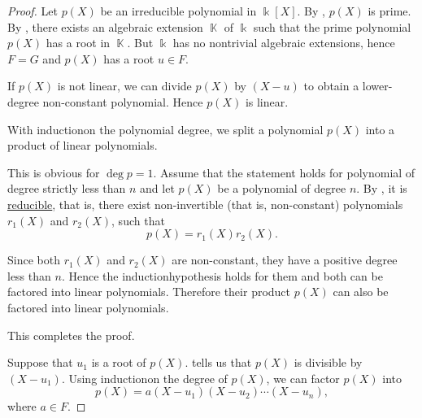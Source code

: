 \begin{proof}
   Let \( p(X) \) be an irreducible polynomial in \( \Bbbk[X] \). By , \( p(X) \) is prime. By , there exists an algebraic extension \( \BbbK \) of \( \Bbbk \) such that the prime polynomial \( p(X) \) has a root in \( \BbbK \). But \( \Bbbk \) has no nontrivial algebraic extensions, hence \( F = G \) and \( p(X) \) has a root \( u \in F \).

  If \( p(X) \) is not linear\LEM, we can divide \( p(X) \) by \( (X - u) \) to obtain a lower-degree non-constant polynomial. Hence \( p(X) \) is linear.

   With induction\IND on the polynomial degree, we split a polynomial \( p(X) \) into a product of linear polynomials.

  This is obvious for \( \deg p = 1 \). Assume that the statement holds for polynomial of degree strictly less than \( n \) and let \( p(X) \) be a polynomial of degree \( n \). By , it is \hyperref[def:irreducible_ring_element]{reducible}, that is, there exist non-invertible (that is, non-constant) polynomials \( r_1(X) \) and \( r_2(X) \), such that
  \begin{equation*}
    p(X) = r_1(X) r_2(X).
  \end{equation*}

  Since both \( r_1(X) \) and \( r_2(X) \) are non-constant, they have a positive degree less than \( n \). Hence the induction\IND hypothesis holds for them and both can be factored into linear polynomials. Therefore their product \( p(X) \) can also be factored into linear polynomials.

  This completes the proof.

   Suppose that \( u_1 \) is a root of \( p(X) \).  tells us that \( p(X) \) is divisible by \( (X - u_1) \). Using induction\IND on the degree of \( p(X) \), we can factor \( p(X) \) into
  \begin{equation*}
    p(X) = a (X - u_1) (X - u_2) \cdots (X - u_n),
  \end{equation*}
  where \( a \in F \).


\end{proof}
